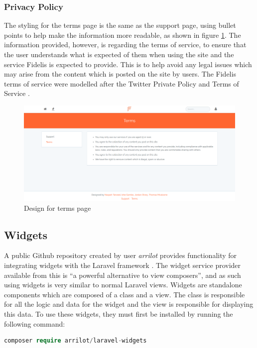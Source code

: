 \subsubsection{Privacy Policy}
The styling for the terms page is the same as the support page, using bullet points to help make the information more readable, as shown in figure \ref{fig:ToS}. The information provided, however, is regarding the terms of service, to ensure that the user understands what is expected of them when using the site and the service Fidelis is expected to provide. This is to help avoid any legal issues which may arise from the content which is posted on the site by users. The Fidelis terms of service were modelled after the Twitter Private Policy \cite{Twitter:PrivatePolicy} and Terms of Service \cite{Twitter:ToS}.

\begin{figure}[H]
\centering
\includegraphics[height=2in]{Images/Design/terms-page}
\caption{Design for terms page}
\label{fig:ToS}
\end{figure}

\subsection{Widgets}
A public Github repository created by user \textit{arrilot} provides functionality for integrating widgets with the Laravel framework \cite{Packagist:LaravelWidgets}. The widget service provider available from this is ``a powerful alternative to view composers'', and as such using widgets is very similar to normal Laravel views. Widgets are standalone components which are composed of a class and a view. The class is responsible for all the logic and data for the widget and the view is responsible for displaying this data. To use these widgets, they must first be installed by running the following command:

\begin{lstlisting}[language=php]
 composer require arrilot/laravel-widgets
\end{lstlisting}

